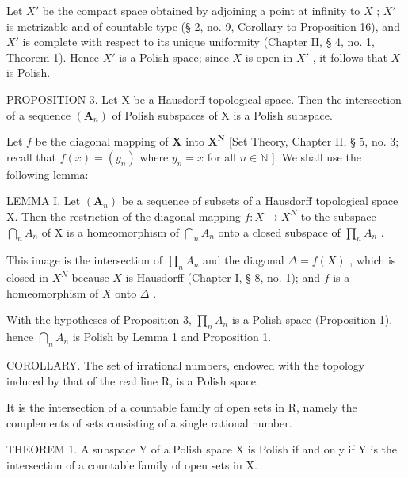 Let \(X'\) be the compact space obtained by adjoining a point at infinity to \(X\) ; \(X'\) is metrizable and of countable type (§ 2, no. 9, Corollary to Proposition 16), and \(X'\) is complete with respect to its unique uniformity (Chapter II, § 4, no. 1, Theorem 1). Hence \(X'\) is a Polish space; since \(X\) is open in \(X'\) , it follows that \(X\) is Polish.

PROPOSITION 3. Let X be a Hausdorff topological space. Then the intersection of a sequence \((\mathbf{A}_{n})\) of Polish subspaces of X is a Polish subspace.

Let \(f\) be the diagonal mapping of \(\mathbf{X}\) into \(\mathbf{X}^{\mathbf{N}}\) {[}Set Theory, Chapter II, § 5, no. 3; recall that \(f(x) = (y_n)\) where \(y_n = x\) for all \(n \in \mathbb{N}\) {]}. We shall use the following lemma:

LEMMA I. Let \((\mathbf{A}_{n})\) be a sequence of subsets of a Hausdorff topological space X. Then the restriction of the diagonal mapping \(f: X \to X^{N}\) to the subspace \(\bigcap_{n} A_{n}\) of X is a homeomorphism of \(\bigcap_{n} A_{n}\) onto a closed subspace of \(\prod_{n} A_{n}\) .

This image is the intersection of \(\prod_{n} A_n\) and the diagonal \(\Delta = f(X)\) , which is closed in \(X^N\) because \(X\) is Hausdorff (Chapter I, § 8, no. 1); and \(f\) is a homeomorphism of \(X\) onto \(\Delta\) .

With the hypotheses of Proposition 3, \(\prod_{n} A_{n}\) is a Polish space (Proposition 1), hence \(\bigcap_{n} A_{n}\) is Polish by Lemma 1 and Proposition 1.

COROLLARY. The set of irrational numbers, endowed with the topology induced by that of the real line R, is a Polish space.

It is the intersection of a countable family of open sets in R, namely the complements of sets consisting of a single rational number.

THEOREM 1. A subspace Y of a Polish space X is Polish if and only if Y is the intersection of a countable family of open sets in X.

